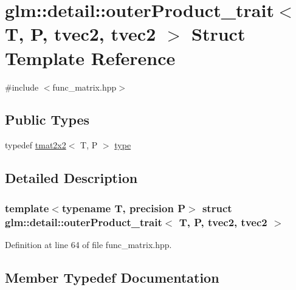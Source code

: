 \hypertarget{structglm_1_1detail_1_1outer_product__trait_3_01_t_00_01_p_00_01tvec2_00_01tvec2_01_4}{}\section{glm\+:\+:detail\+:\+:outer\+Product\+\_\+trait$<$ T, P, tvec2, tvec2 $>$ Struct Template Reference}
\label{structglm_1_1detail_1_1outer_product__trait_3_01_t_00_01_p_00_01tvec2_00_01tvec2_01_4}


{\ttfamily \#include $<$func\+\_\+matrix.\+hpp$>$}

\subsection*{Public Types}
\begin{DoxyCompactItemize}
\item 
typedef \hyperlink{structglm_1_1detail_1_1tmat2x2}{tmat2x2}$<$ T, P $>$ \hyperlink{structglm_1_1detail_1_1outer_product__trait_3_01_t_00_01_p_00_01tvec2_00_01tvec2_01_4_a390fb582fa7caa73e53f69181b3b334e}{type}
\end{DoxyCompactItemize}


\subsection{Detailed Description}
\subsubsection*{template$<$typename T, precision P$>$\newline
struct glm\+::detail\+::outer\+Product\+\_\+trait$<$ T, P, tvec2, tvec2 $>$}



Definition at line 64 of file func\+\_\+matrix.\+hpp.



\subsection{Member Typedef Documentation}
\mbox{\label{structglm_1_1detail_1_1outer_product__trait_3_01_t_00_01_p_00_01tvec2_00_01tvec2_01_4_a390fb582fa7caa73e53f69181b3b334e}} 
